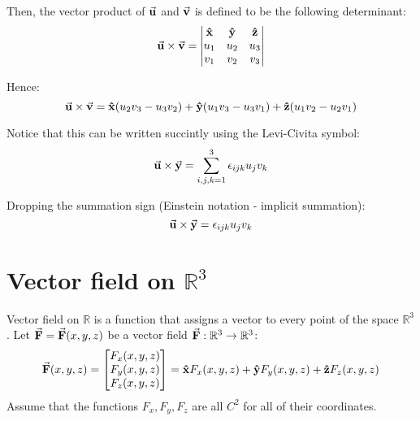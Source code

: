\documentclass[12pt]{article}
\begin{document}
Then, the vector product of $\va{u}$ and $\va{v}$ is defined to be the following determinant:
\begin{equation}
\va{u} \times \va{v} = 
\begin{vmatrix}
\vu{x} & \vu{y} & \vu{z} \\
u_1 & u_2 & u_3 \\
v_1 & v_2 & v_3
\end{vmatrix} 
\end{equation}

\noindent
Hence:
\begin{equation}
\va{u} \times \va{v} = 
\vu{x} (u_2 v_3 - u_3 v_2) +
\vu{y} (u_1 v_3 - u_3 v_1) +
\vu{z} (u_1 v_2 - u_2 v_1)
\end{equation}

\noindent
Notice that this can be written succintly using the Levi-Civita symbol:
\begin{equation*}
\va{u} \times \va{y} = \sum_{i,j,k=1}^{3} \epsilon_{ijk}u_jv_k
\end{equation*}

\noindent Dropping the summation sign (Einstein notation - implicit summation):
\begin{equation*}
\va{u} \times \va{y} = \epsilon_{ijk}u_jv_k
\end{equation*}

\section{Vector field on $\mathbb{R}^3$}
Vector field on $\mathbb{R}$ is a function that assigns a vector to every point 
of the space $\mathbb{R}^3$. Let $\va{F} = \va{F}(x, y, z)$ be a vector field 
$\va{F}: \mathbb{R}^3 \rightarrow \mathbb{R}^3$:
\begin{equation*}
\va{F}(x, y, z) = 
\begin{bmatrix}
F_x(x, y, z) \\
F_y(x, y, z) \\
F_z(x, y, z)
\end{bmatrix} =
\vu{x} F_x(x, y, z) + \vu{y} F_y(x, y, z) + \vu{z} F_z(x, y, z)
\end{equation*}
Assume that the functions $F_x, F_y, F_z$ are all $C^2$ for all of 
their coordinates.
\end{document}
